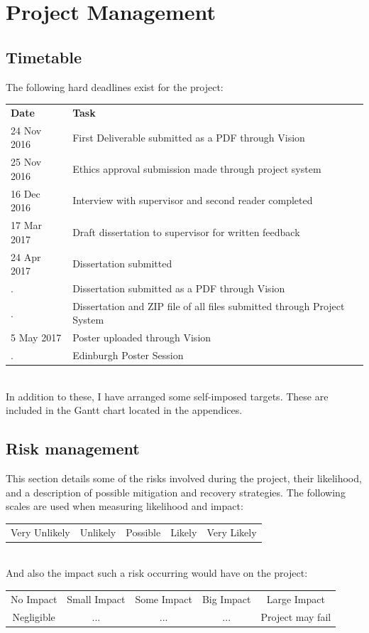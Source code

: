 \documentclass[a4paper,11pt]{report}
\begin{document}

\chapter{Project Management}
\section{Timetable}
The following hard deadlines exist for the project:\\
\begin{tabularx}{\textwidth}{lX}
\textbf{Date} & \textbf{Task}\\
24 Nov 2016 & First Deliverable submitted as a PDF through Vision\\
25 Nov 2016 & Ethics approval submission made through project system\\
16 Dec 2016 & Interview with supervisor and second reader completed\\
17 Mar 2017 & Draft dissertation to supervisor for written feedback\\
24 Apr 2017 & Dissertation submitted\\
. & Dissertation submitted as a PDF through Vision\\
. & Dissertation and ZIP file of all files submitted through Project System\\
 5 May 2017 & Poster uploaded through Vision\\
. & Edinburgh Poster Session
\end{tabularx}\\
In addition to these, I have arranged some self-imposed targets. These are included in the Gantt chart located in the appendices.

\section{Risk management}
This section details some of the risks involved during the project, their likelihood, and a description of possible mitigation and recovery strategies. The following scales are used when measuring likelihood and impact:\\
\begin{tabular}{c|c|c|c|c}
Very Unlikely & Unlikely & Possible & Likely & Very Likely
\end{tabular}\\
And also the impact such a risk occurring would have on the project:\\
\begin{tabular}{c|c|c|c|c}
 No Impact & Small Impact & Some Impact & Big Impact & Large Impact\\
 Negligible & ... & ... & ... & Project may fail
\end{tabular}\\
\end{document}

